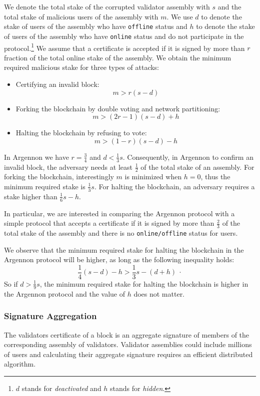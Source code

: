 We denote the total stake of the corrupted validator assembly with $s$ and the total stake of malicious users of the
assembly with $m$. We use $d$ to denote the stake of users of the assembly who have \texttt{offline} status and $h$
to denote the stake of users of the assembly who have \texttt{online} status and do not participate in the
protocol.\footnote{$d$ stands for \emph{deactivated} and $h$ stands for \emph{hidden}.} We assume
that a certificate is accepted if it is signed by more than $r$ fraction of the total online stake of the assembly.
We obtain the minimum required malicious stake for three types of attacks:
\begin{itemize}
    \item Certifying an invalid block:
    \[ m > r(s-d) \]
    \item Forking the blockchain by double voting and network partitioning:
    \[m > (2r-1)(s-d)+h \]
    \item Halting the blockchain by refusing to vote:
    \[m > (1-r)(s-d)-h \]
\end{itemize}

In Argennon we have $r=\frac{3}{4}$ and $d < \frac{1}{3}s$.
Consequently, in Argennon to confirm an invalid block, the adversary needs at least $\frac{1}{2}$ of the total stake
of an assembly. For forking the blockchain, interestingly $m$ is
minimized when $h=0$, thus the minimum required stake is $\frac{1}{3}s$. For halting the blockchain,
an adversary requires a stake higher than $\frac{1}{6}s-h$.

In particular, we are interested in comparing the Argennon protocol with a simple protocol that accepts a certificate
if it is signed by more than $\frac{2}{3}$ of the total stake of the assembly and there is no \texttt{online/offline}
status for users.

We observe that the minimum required stake for halting the blockchain in the Argennon protocol will be higher, as
long as the
following inequality holds:
\[
    \frac{1}{4}(s-d)-h > \frac{1}{3}s-(d+h)\ \cdot
\]
So if $d>\frac{1}{9}s$, the minimum required stake for halting the blockchain is higher in the
Argennon protocol and the value of $h$ does not matter.

\subsubsection{Signature Aggregation}\label{subsubsec:sig-agg}

The validators certificate of a block is an aggregate signature of members of the corresponding assembly of
validators. Validator assemblies could include millions of users and calculating their aggregate
signature requires an efficient distributed algorithm.

